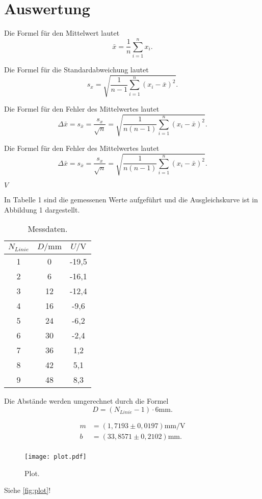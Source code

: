 \section{Auswertung}
\label{sec:Auswertung}

Die Formel für den Mittelwert lautet
 \begin{equation}
    \bar{x}=\frac{1}{n}\sum_{i=1}^n x_i .
\end{equation}

Die Formel für die Standardabweichung lautet
\begin{equation}
    s_x=\sqrt{\frac{1}{n-1}\sum_{i=1}^n {(x_i-\bar{x})^2 }}.
\end{equation}

Die Formel für den Fehler des Mittelwertes lautet
\begin{equation}
    \Delta \bar{x} = s_{\bar{x}}=\frac{s_x}{\sqrt{n}}= \sqrt{\frac{1}{n(n-1)}\sum_{i=1}^n {(x_i-\bar{x})^2 }}.
\end{equation}

Die Formel für den Fehler des Mittelwertes lautet
\begin{equation}
    \Delta \bar{x} = s_{\bar{x}}=\frac{s_x}{\sqrt{n}}= \sqrt{\frac{1}{n(n-1)}\sum_{i=1}^n {(x_i-\bar{x})^2 }}.
\end{equation}

$V$

In Tabelle 1 sind die gemessenen Werte aufgeführt und die Ausgleichskurve ist in Abbildung 1 dargestellt.
\begin{table}
  \centering
  \caption{Messdaten.}
  \label{tab:some_data}
  \begin{tabular}{ccc}
    \toprule
    $N_{Linie}$ & $D /   \mathrm{mm}$  & $U /  \mathrm{V} $\\
    \midrule
    1 & 0 & -19,5 \\
    2 & 6 & -16,1 \\
    3 & 12 & -12,4 \\
    4 & 16 & -9,6\\
    5 & 24 & -6,2 \\
    6 & 30 & -2,4 \\
    7 & 36 & 1,2 \\
    8 & 42 & 5,1 \\
    9 & 48 & 8,3 \\

    \bottomrule
  \end{tabular}
\end{table}

Die Abstände werden umgerechnet durch die Formel
\begin{equation}
  D = (N_{Linie}-1) \cdot 6  \mathrm{mm}.
\end{equation}

\begin{align*}
  m &= (1,7193 \pm 0,0197)  \si{\milli\meter\per\volt}    \\
  b &= (33,8571 \pm 0,2102 )  \si{\milli\meter} .\\
\end{align*}


\begin{figure}
  \centering
  \texttt{[image: plot.pdf]}
  \caption{Plot.}
  \label{fig:plot}
\end{figure}


Siehe \autoref{fig:plot}!
